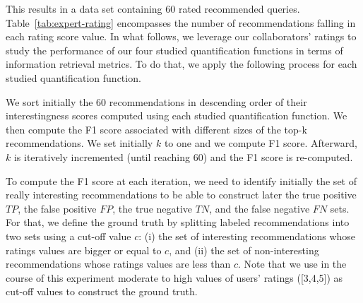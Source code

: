 This results in a data set containing 60 rated recommended queries. 
Table~\ref{tab:expert-rating} encompasses the number of recommendations falling in each rating score value.
In what follows, we leverage our collaborators' ratings to study the performance of our four studied quantification functions in terms of information retrieval metrics.
To do that, we apply the following process for each studied quantification function.
   \begin{table}[b]
 \centering 
 \scriptsize
{}
 \caption{Rated explorations}
 \label{tab:expert-rating}
 \end{table}




We sort initially the 60 recommendations in descending order of their interestingness scores computed using each studied quantification function. We then compute  the F1 score associated with different sizes of the top-k recommendations.
We set initially $k$ to one and we compute F1 score. Afterward, $k$ is iteratively incremented (until reaching 60) and the F1 score is re-computed.

To compute the F1 score at each iteration, we need to identify initially the set of really interesting recommendations to be able to construct later the true positive $TP$, the false positive $FP$, the true negative $TN$, and the false negative $FN$ sets.
For that, we define the ground truth by splitting labeled recommendations into two sets using a cut-off value $c$: (i) the set of interesting recommendations whose ratings values are bigger or equal to $c$, and (ii) the set of non-interesting recommendations whose ratings values are less than $c$.
Note that we use in the course of this experiment moderate to high values of users' ratings ([3,4,5]) as cut-off values to construct the ground truth.

